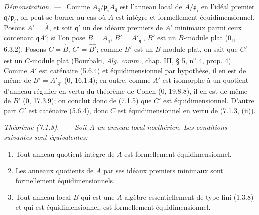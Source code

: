 \documentclass[10pt,oneside]{book}
\newenvironment{theorem}[1][]{%
  \par\medskip\noindent\itshape Théorème (#1). ---\ }{\par}
\newenvironment{proof}{%
  \par\medskip\noindent\textit{Démonstration. ---\ }}{\par}
\begin{document}
\begin{proof}
Comme $A_{\mathfrak q}/\mathfrak p_iA_{\mathfrak q}$ est l'anneau local de
$A/\mathfrak p_i$ en l'idéal premier $\mathfrak q/\mathfrak p_i$, on peut
se borner au cas où $A$ est intègre et formellement équidimensionnel. Posons
$A'=\widehat A$, et soit $\mathfrak q'$ un des idéaux premiers de $A'$
minimaux parmi ceux contenant $\mathfrak qA'$; si l'on pose
$B=A_{\mathfrak q}$, $B'=A'_{\mathfrak q'}$, $B'$ est un $B$-module plat
(0$_{\mathrm I}$, 6.3.2). Posons $C=\widehat B$, $C'=\widehat {B'}$; comme
$B'$ est un $B$-module plat, on sait que $C'$ est un $C$-module plat
(Bourbaki, \emph{Alg. comm.}, chap. III, § 5, n\textsuperscript{o} 4,
prop. 4). Comme $A'$ est caténaire (5.6.4) et équidimensionnel par
hypothèse, il en est de même de $B'=A'_{\mathfrak q'}$ (0, 16.1.4); en
outre, comme $A'$ est isomorphe à un quotient d'anneau régulier en vertu du
théorème de Cohen (0, 19.8.8), il en est de même de $B'$ (0, 17.3.9); on
conclut donc de (7.1.5) que $C'$ est équidimensionnel. D'autre part $C'$ est
caténaire (5.6.4), donc $C$ est équidimensionnel en vertu de (7.1.3, (ii)).
\end{proof}

\begin{theorem}[7.1.8]
\label{IV.2.s7.1.8-fr}
Soit $A$ un anneau local noethérien. Les conditions suivantes sont
équivalentes:
\begin{enumerate}
\item[a)] Tout anneau quotient intègre de $A$ est formellement équidimensionnel.
\item[b)] Les anneaux quotients de $A$ par ses idéaux premiers minimaux sont
formellement équidimensionnels.
\item[c)] Tout anneau local $B$ qui est une $A$-algèbre essentiellement de type
fini (1.3.8) et qui est équidimensionnel, est formellement
équidimensionnel.
\end{enumerate}
\end{theorem}
\end{document}
